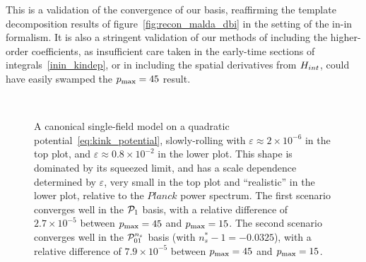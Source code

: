 This is a validation of the convergence of our basis,
reaffirming the template decomposition results of figure~\ref{fig:recon_malda_dbi}
in the setting of the in-in formalism.
It is also a stringent validation of our methods of including the higher-order
coefficients, as insufficient care taken in the early-time sections of
integrals~\eqref{inin_kindep}, or in including the spatial derivatives
from $H_{int}$, could have easily swamped the $p_\text{max}=45$ result.


\begin{figure}[!pth]
\centering
    \\[-2ex]
\caption{
    A canonical single-field model on a quadratic
    potential~\eqref{eq:kink_potential},
    slowly-rolling with $\varepsilon\approx2\times10^{-6}$
    in the top plot, and $\varepsilon\approx0.8\times10^{-2}$
    in the lower plot.
    This shape is dominated by its squeezed limit,
    and has a scale dependence determined by $\varepsilon$,
    very small in the top plot and ``realistic'' in the
    lower plot, relative to the $\textit{Planck}$ power spectrum.
    The first scenario converges well in the $\mathcal{P}_1$ basis,
    with a relative difference of $2.7\times10^{-5}$
    between $p_\text{max}=45$ and $p_\text{max}=15$.
    The second scenario converges well in the $\mathcal{P}^{n_s}_{01}$ basis
    (with $n_s^{*}-1 = -0.0325$),
    with a relative difference of $7.9\times10^{-5}$
    between $p_\text{max}=45$ and $p_\text{max}=15$.
}\label{slice_plot_malda}
\end{figure}


